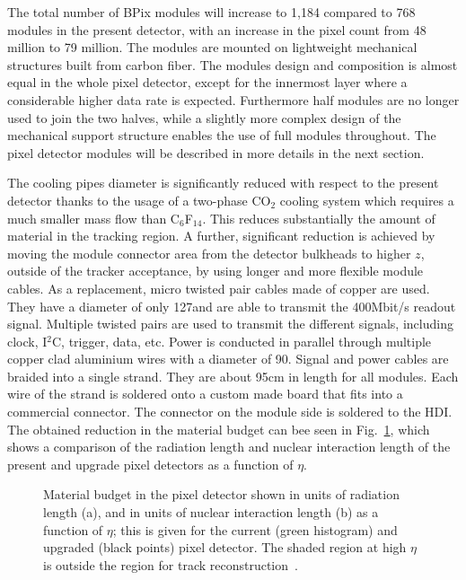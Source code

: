 The total number of BPix modules will increase to 1,184 compared to 768 modules in the present detector, with an increase in the pixel count from 48 million to 79 million.
The modules are mounted on lightweight mechanical structures built from carbon fiber.
The modules design and composition is almost equal in the whole pixel detector, except for the innermost layer where a considerable higher data rate is expected.
Furthermore half modules are no longer used to join the two halves, while a slightly more complex design of the mechanical support structure enables the use of full modules throughout.
The pixel detector modules will be described in more details in the next section.

The cooling pipes diameter is significantly reduced with respect to the present detector thanks to the usage of a two-phase CO$_2$ cooling system which requires a much smaller mass flow than C$_6$F$_{14}$.
This reduces substantially the amount of material in the tracking region. A further, significant reduction is achieved by moving the module connector area from the detector bulkheads to higher $z$, outside of the tracker acceptance, by using longer and more flexible module cables. As a replacement, micro twisted pair cables made of copper are used. They have a diameter of only 127\mum and are able to transmit the 400\unit{Mbit/s} readout signal. Multiple twisted pairs are used to transmit the different signals, including clock, I$^2$C, trigger, data, etc. Power is conducted in parallel through multiple copper clad aluminium wires with a diameter of 90\mum. Signal and power cables are braided into a single strand. They are about 95\unit{cm} in length for all modules. Each wire of the strand is soldered onto a custom made board that fits into a commercial connector. The connector on the module side is soldered to the HDI.
The obtained reduction in the material budget can bee seen in Fig.~\ref{fig:Phase1Budget}, which shows a comparison of the radiation length and nuclear interaction length of the present and upgrade pixel detectors as a function of $\eta$.

\begin{figure}[!htb]
 \begin{center}
 \end{center}
 \caption{Material budget in the pixel detector shown in units of radiation length (a), and in units of nuclear interaction length (b) as a function of $\eta$; this is given for the current (green histogram) and upgraded (black points) pixel detector. The shaded region at high $\eta$ is outside the region for track reconstruction~\cite{Dominguez:1481838}.}
 \label{fig:Phase1Budget}
\end{figure}


